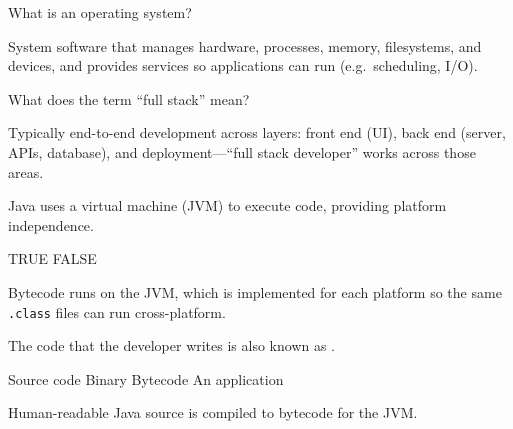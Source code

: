 \question[4]
What is an operating system?
\begin{solutionorbox}[1.15in]
  System software that manages hardware, processes, memory, filesystems, and devices, and provides services so applications can run (e.g.\ scheduling, I/O).
\end{solutionorbox}

\question[4]
What does the term ``full stack'' mean?
\begin{solutionorbox}[1.15in]
  Typically end-to-end development across layers: front end (UI), back end (server, APIs, database), and deployment---``full stack developer'' works across those areas.
\end{solutionorbox}

\newpage



\question[4]
Java uses a virtual machine (JVM) to execute code, providing platform independence.
\begin{choices}
  \CorrectChoice TRUE
  \choice FALSE
\end{choices}
\begin{solution}
  Bytecode runs on the JVM, which is implemented for each platform so the same \texttt{.class} files can run cross-platform.
\end{solution}

\question[4]
The code that the developer writes is also known as \blank[5em].
\begin{choices}
  \CorrectChoice Source code
  \choice Binary
  \choice Bytecode
  \choice An application
\end{choices}
\begin{solution}
  Human-readable Java source is compiled to bytecode for the JVM.
\end{solution}

